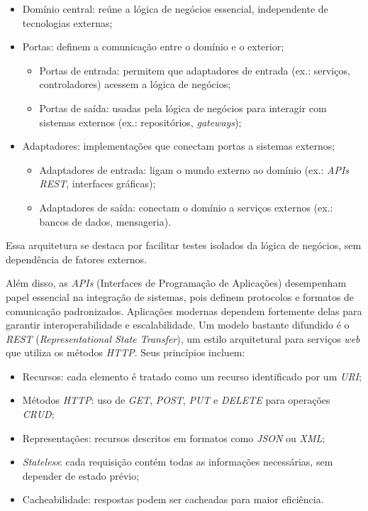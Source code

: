 \documentclass[english,brazilian]{UNISINOSartigo} %
\begin{document}
\begin{itemize}[leftmargin=1cm, itemsep=0.1em, topsep=0.1em]
    \item Domínio central: reúne a lógica de negócios essencial, independente de tecnologias externas;
    \item Portas: definem a comunicação entre o domínio e o exterior;
    \begin{itemize}[leftmargin=1.2cm, itemsep=0.1em, topsep=0.1em]
        \item Portas de entrada: permitem que adaptadores de entrada (ex.: serviços, controladores) acessem a lógica de negócios;
        \item Portas de saída: usadas pela lógica de negócios para interagir com sistemas externos (ex.: repositórios, \textit{gateways});
    \end{itemize}
    \item Adaptadores: implementações que conectam portas a sistemas externos;
    \begin{itemize}[leftmargin=1.2cm, itemsep=0.1em, topsep=0.1em] 
        \item Adaptadores de entrada: ligam o mundo externo ao domínio (ex.: \textit{APIs REST}, interfaces gráficas);
        \item Adaptadores de saída: conectam o domínio a serviços externos (ex.: bancos de dados, mensageria).
    \end{itemize}
\end{itemize}

Essa arquitetura se destaca por facilitar testes isolados da lógica de negócios, sem dependência de fatores externos.

Além disso, as \textit{APIs} (Interfaces de Programação de Aplicações) desempenham papel essencial na integração de sistemas, pois definem protocolos e formatos de comunicação padronizados. Aplicações modernas dependem fortemente delas para garantir interoperabilidade e escalabilidade. Um modelo bastante difundido é o \textit{REST} (\textit{Representational State Transfer}), um estilo arquitetural para serviços \textit{web} que utiliza os métodos \textit{HTTP}. Seus princípios incluem:

\begin{itemize}[leftmargin=1cm, itemsep=0.1em, topsep=0.1em]
    \item Recursos: cada elemento é tratado como um recurso identificado por um \textit{URI};
    \item Métodos \textit{HTTP}: uso de \textit{GET}, \textit{POST}, \textit{PUT} e \textit{DELETE} para operações \textit{CRUD};
    \item Representações: recursos descritos em formatos como \textit{JSON} ou \textit{XML};
    \item \textit{Stateless}: cada requisição contém todas as informações necessárias, sem depender de estado prévio;
    \item Cacheabilidade: respostas podem ser cacheadas para maior eficiência.
\end{itemize}
\end{document}
